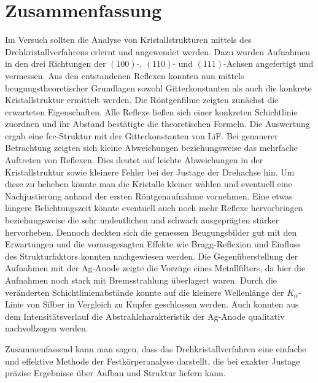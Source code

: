 \section{Zusammenfassung} %
\label{sec:zusammenfassung}

	Im Versuch sollten die Analyse von Kristallstrukturen mittels des Drehkristallverfahrens erlernt und angewendet werden.
	Dazu wurden Aufnahmen in den drei Richtungen der $(100)$-, $(110)$- und $(111)$-Achsen angefertigt und vermessen.
	Aus den entstandenen Reflexen konnten nun mittels beugungstheoretischer Grundlagen sowohl Gitterkonstanten als auch die konkrete Kristallstruktur ermittelt werden.
	Die Röntgenfilme zeigten zunächst die erwarteten Eigenschaften.
	Alle Reflexe ließen sich einer konkreten Schichtlinie zuordnen und ihr Abstand bestätigte die theoretischen Formeln.
	Die Auswertung ergab eine fcc-Struktur mit der Gitterkonstanten von LiF.
	Bei genauerer Betrachtung zeigten sich kleine Abweichungen beziehungsweise das mehrfache Auftreten von Reflexen.
	Dies deutet auf leichte Abweichungen in der Kristallstruktur sowie kleinere Fehler bei der Justage der Drehachse hin.
	Um diese zu beheben könnte man die Kristalle kleiner wählen und eventuell eine Nachjustierung anhand der ersten Röntgenaufnahme vornehmen.
	Eine etwas längere Belichtungszeit könnte eventuell auch noch mehr Reflexe hervorbringen beziehungsweise die sehr undeutlichen und schwach ausgeprägten stärker hervorheben.
	Dennoch deckten sich die gemessen Beugungsbilder gut mit den Erwartungen und die vorausgesagten Effekte wie Bragg-Reflexion und Einfluss des Strukturfaktors konnten nachgewiesen werden.
	Die Gegenüberstellung der Aufnahmen mit der Ag-Anode zeigte die Vorzüge eines Metallfilters, da hier die Aufnahmen noch stark mit Bremsstrahlung überlagert waren.
	Durch die veränderten Schichtlinienabstände konnte auf die kleinere Wellenlänge der $K_\alpha$-Linie von Silber in Vergleich zu Kupfer geschlossen werden.
	Auch konnten aus dem Intensitätsverlauf die Abstrahlcharakteristik der Ag-Anode qualitativ nachvollzogen werden.

	Zusammenfassend kann man sagen, dass das Drehkristallverfahren eine einfache und effektive Methode der Festkörperanalyse darstellt, die bei exakter Justage präzise Ergebnisse über Aufbau und Struktur liefern kann.
